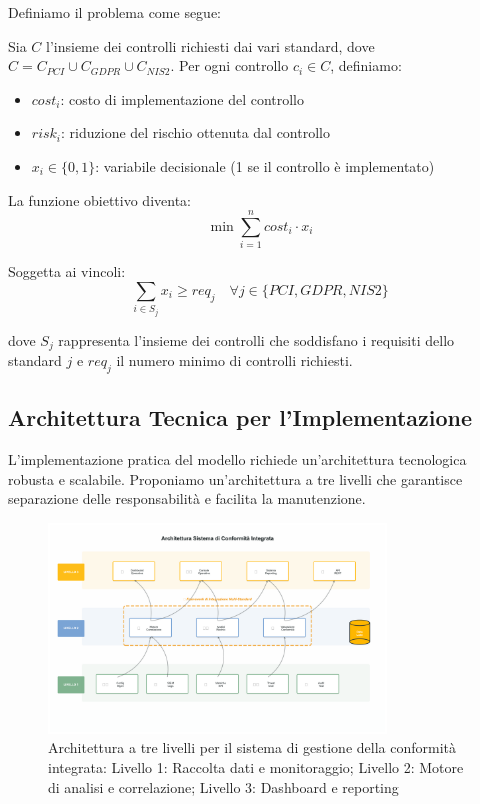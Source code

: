 Definiamo il problema come segue:

Sia $C$ l'insieme dei controlli richiesti dai vari standard, dove $C = C_{PCI} \cup C_{GDPR} \cup C_{NIS2}$. Per ogni controllo $c_i \in C$, definiamo:
\begin{itemize}
    \item $cost_i$: costo di implementazione del controllo
    \item $risk_i$: riduzione del rischio ottenuta dal controllo
    \item $x_i \in \{0,1\}$: variabile decisionale (1 se il controllo è implementato)
\end{itemize}

La funzione obiettivo diventa:
\begin{equation}
\min \sum_{i=1}^{n} cost_i \cdot x_i
\end{equation}

Soggetta ai vincoli:
\begin{equation}
\sum_{i \in S_j} x_i \geq req_j \quad \forall j \in \{PCI, GDPR, NIS2\}
\end{equation}

dove $S_j$ rappresenta l'insieme dei controlli che soddisfano i requisiti dello standard $j$ e $req_j$ il numero minimo di controlli richiesti.

\subsection{Architettura Tecnica per l'Implementazione}
\label{subsec:4.3.2_architettura}

L'implementazione pratica del modello richiede un'architettura tecnologica robusta e scalabile. Proponiamo un'architettura a tre livelli che garantisce separazione delle responsabilità e facilita la manutenzione.

\begin{figure}[h]
\centering
\includegraphics[width=0.8\textwidth]{thesis_figures/cap4/figura_4_2_architettura_premium.pdf}
\caption[Architettura a tre livelli per la conformità integrata]{Architettura a tre livelli per il sistema di gestione della conformità integrata: Livello 1: Raccolta dati e monitoraggio; Livello 2: Motore di analisi e correlazione; Livello 3: Dashboard e reporting}
\label{fig:architettura_sistema}
\end{figure}

